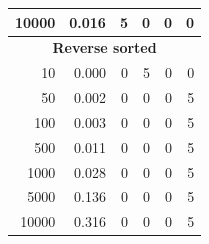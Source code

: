 \documentclass{article}
\begin{document}
\begin{table}[H]
\begin{tabular}{|r|r|r|r|r|r|}
10000 & 0.016 & 5 & 0 & 0 & 0 \\
\hline
\multicolumn{6}{|c|}{\textbf{Reverse sorted}} \\
\hline
10 & 0.000 & 0 & 5 & 0 & 0 \\
50 & 0.002 & 0 & 0 & 0 & 5 \\
100 & 0.003 & 0 & 0 & 0 & 5 \\
500 & 0.011 & 0 & 0 & 0 & 5 \\
1000 & 0.028 & 0 & 0 & 0 & 5 \\
5000 & 0.136 & 0 & 0 & 0 & 5 \\
10000 & 0.316 & 0 & 0 & 0 & 5 \\
\hline
\end{tabular}
\end{table}
\end{document}
